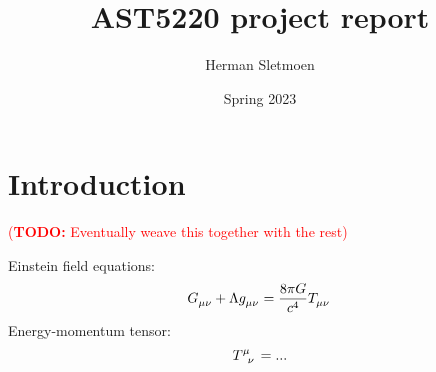 \documentclass[10pt,a4paper]{article}
\newcommand\TODO[1]{\textcolor{red}{(\textbf{TODO:} #1)}}
\begin{document}
\title{AST5220 project report}
\author{Herman Sletmoen}

\date{Spring 2023}

\iffalse
\abstract
{Solve Einstein-Boltzmann equations}
{Solve Einstein-Boltzmann equations}
{Solve Einstein-Boltzmann equations}
{Solve Einstein-Boltzmann equations}
{Solve Einstein-Boltzmann equations}
\fi


\maketitle
%

\section{Introduction}

\TODO{Eventually weave this together with the rest}

Einstein field equations:
\begin{equation}
	G\indices{_\mu_\nu} + \Lambda g\indices{_\mu_\nu} = \frac{8 \pi G}{c^4} T\indices{_\mu_\nu}
\label{eq_einstein}
\end{equation}
Energy-momentum tensor:
\begin{equation}
	T\indices{^\mu_\nu} = ...
\label{eq_energy_momentum}
\end{equation}
\end{document}
